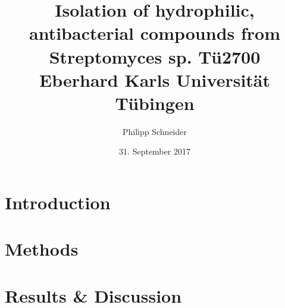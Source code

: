 

\title{
	{Isolation of hydrophilic, antibacterial compounds from Streptomyces sp. Tü2700}\\
	{\large Eberhard Karls Universit{}ät Tübingen}\\
}
\author{Philipp Schneider}{}
\date{31. September 2017}








\tableofcontents
\listoffigures
\listoftables

\section{Introduction}


\section{Methods}


\section{Results \& Discussion}


%

%
